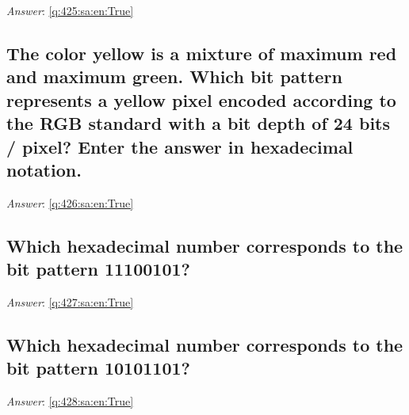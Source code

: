 \documentclass[a4paper,11pt,oneside]{article}
\begin{document}
\begin{sloppypar}
\vspace{1cm}

\textit{Answer}: \autoref{q:425:sa:en:True}



\subsection{The color yellow is a mixture of maximum red and maximum green. Which bit pattern represents a yellow pixel encoded according to the RGB standard with a bit depth of 24 bits / pixel? Enter the answer in hexadecimal notation.}

\label{q:426:sa:en:False}

\vspace{2cm}

\noindent\makebox[\textwidth]{\hrulefill}

\vspace{1cm}

\textit{Answer}: \autoref{q:426:sa:en:True}



\subsection{Which hexadecimal number corresponds to the bit pattern 11100101?}

\label{q:427:sa:en:False}

\vspace{2cm}

\noindent\makebox[\textwidth]{\hrulefill}

\vspace{1cm}

\textit{Answer}: \autoref{q:427:sa:en:True}



\subsection{Which hexadecimal number corresponds to the bit pattern 10101101?}

\label{q:428:sa:en:False}

\vspace{2cm}

\noindent\makebox[\textwidth]{\hrulefill}

\vspace{1cm}

\textit{Answer}: \autoref{q:428:sa:en:True}




\end{sloppypar}
\end{document}

